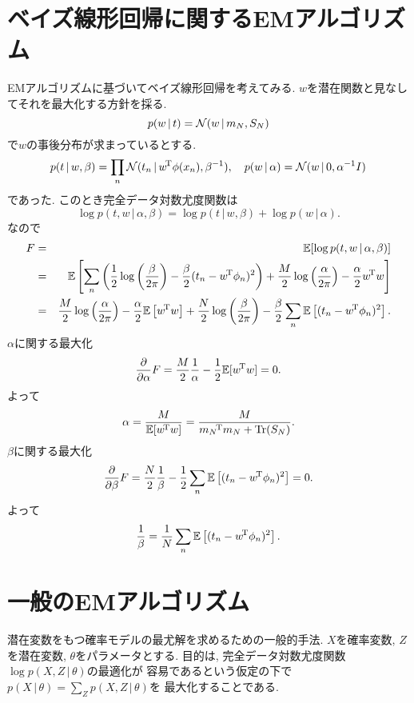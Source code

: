 \section{ベイズ線形回帰に関するEMアルゴリズム}
EMアルゴリズムに基づいてベイズ線形回帰を考えてみる.
$w$を潜在関数と見なしてそれを最大化する方針を採る.
$$
p(w\,|\,t)={\cal N}(w\,|\,m_N,S_N)
$$
で$w$の事後分布が求まっているとする.
$$
p(t\,|\,w,\beta)=\prod_n {\cal N}(t_n\,|\,{w}^{\!\mathrm{T}}\phi(x_n), \beta^{-1}), \quad
p(w\,|\,\alpha)={\cal N}(w\,|\,0, \alpha^{-1}I)
$$
であった.
このとき完全データ対数尤度関数は
$$
\log p(t,w\,|\,\alpha,\beta)=\log p(t\,|\,w,\beta) + \log p(w\,|\,\alpha).
$$
なので
\begin{eqnarray*}
F &=& \mathbb{E}[\log p(t,w\,|\,\alpha,\beta)]\\
 &=& \mathbb{E}\left[\sum_n \left(\frac{1}{2} \log \left(\frac{\beta}{2\pi}\right)
     -\frac{\beta}{2}(t_n-{w}^{\!\mathrm{T}}\phi_n)^2\right)
     +\frac{M}{2}\log \left(\frac{\alpha}{2\pi}\right) - \frac{\alpha}{2}{w}^{\!\mathrm{T}}w\right]\\
 &=& \frac{M}{2}\log \left(\frac{\alpha}{2\pi}\right)-\frac{\alpha}{2}\mathbb{E}\left[{w}^{\!\mathrm{T}}w\right]
     +\frac{N}{2}\log \left(\frac{\beta}{2\pi}\right)-\frac{\beta}{2}\sum_n \mathbb{E}\left[(t_n-{w}^{\!\mathrm{T}}\phi_n)^2\right].
\end{eqnarray*}
$\alpha$に関する最大化
$$
\frac{\partial}{\partial \alpha}F=\frac{M}{2}\frac{1}{\alpha}-\frac{1}{2} \mathbb{E}[{w}^{\!\mathrm{T}}w]=0.
$$
よって
$$
\alpha=\frac{M}{\mathbb{E}[{w}^{\!\mathrm{T}}w]}=\frac{M}{{m_N}^{\!\mathrm{T}}m_N+\mathop{\mathrm{Tr}}\nolimits(S_N)}.
$$
$\beta$に関する最大化
$$
\frac{\partial}{\partial \beta}F=\frac{N}{2}\frac{1}{\beta}-\frac{1}{2}\sum_n \mathbb{E}\left[(t_n-{w}^{\!\mathrm{T}}\phi_n)^2\right]=0.
$$
よって
$$
\frac{1}{\beta}=\frac{1}{N}\sum_n \mathbb{E}\left[(t_n-{w}^{\!\mathrm{T}}\phi_n)^2\right].
$$
\vspace{0pt}

\section{一般のEMアルゴリズム}
潜在変数をもつ確率モデルの最尤解を求めるための一般的手法.
$X$を確率変数, $Z$を潜在変数, $\theta$をパラメータとする.
目的は, 完全データ対数尤度関数$\log p(X,Z\,|\,\theta)$の最適化が
容易であるという仮定の下で$p(X\,|\,\theta)=\sum_Z p(X,Z\,|\,\theta)$を
最大化することである.

